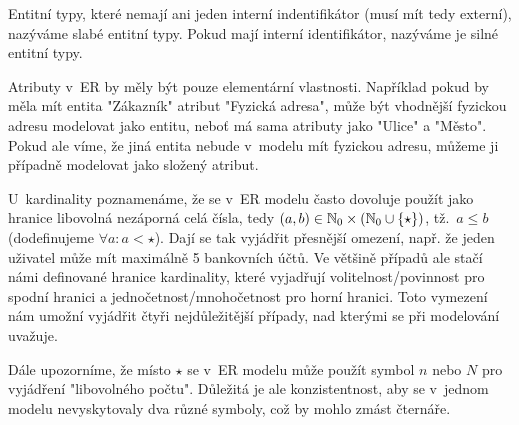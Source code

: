Entitní typy, které nemají ani jeden interní indentifikátor (musí mít tedy externí), nazýváme slabé entitní typy.
Pokud mají interní identifikátor, nazýváme je silné entitní typy.

Atributy v~ER by měly být pouze elementární vlastnosti.
Například pokud by měla mít entita "Zákazník" atribut "Fyzická adresa", může být vhodnější fyzickou adresu modelovat jako entitu, neboť má sama atributy jako "Ulice" a "Město".
Pokud ale víme, že jiná entita nebude v~modelu mít fyzickou adresu, můžeme ji případně modelovat jako složený atribut.

U~kardinality poznamenáme, že se v~ER modelu často dovoluje použít jako hranice libovolná nezáporná celá čísla, tedy $(a, b)\in \mathbb N_0\times \left(\mathbb N_0 \cup \left\{\star\right\}\right)$, tž.~$a\leq b$ (dodefinujeme $\forall a\colon a < \star$).
Dají se tak vyjádřit přesnější omezení, např. že jeden uživatel může mít maximálně 5 bankovních účtů.
Ve většině případů ale stačí námi definované hranice kardinality, které vyjadřují volitelnost/povinnost pro spodní hranici a jednočetnost/mnohočetnost pro horní hranici.
Toto vymezení nám umožní vyjádřit čtyři nejdůležitější případy, nad kterými se při modelování uvažuje.

Dále upozorníme, že místo $\star$ se v~ER modelu může použít symbol $n$ nebo $N$ pro vyjádření "libovolného počtu".
Důležitá je ale konzistentnost, aby se v~jednom modelu nevyskytovaly dva různé symboly, což by mohlo zmást čternáře.

